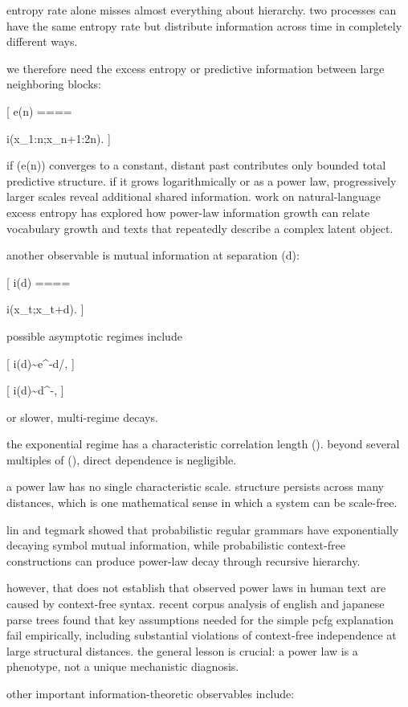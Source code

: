 entropy rate alone misses almost everything about hierarchy. two processes can have the same entropy rate but distribute information across time in completely different ways.

we therefore need the excess entropy or predictive information between large neighboring blocks:

[
e(n)
====

i(x_{1:n};x_{n+1:2n}).
]

if (e(n)) converges to a constant, distant past contributes only bounded total predictive structure. if it grows logarithmically or as a power law, progressively larger scales reveal additional shared information. work on natural-language excess entropy has explored how power-law information growth can relate vocabulary growth and texts that repeatedly describe a complex latent object.

another observable is mutual information at separation (d):

[
i(d)
====

i(x_t;x_{t+d}).
]

possible asymptotic regimes include

[
i(d)\sim e^{-d/\xi},
]

[
i(d)\sim d^{-\eta},
]

or slower, multi-regime decays.

the exponential regime has a characteristic correlation length (\xi). beyond several multiples of (\xi), direct dependence is negligible.

a power law has no single characteristic scale. structure persists across many distances, which is one mathematical sense in which a system can be scale-free.

lin and tegmark showed that probabilistic regular grammars have exponentially decaying symbol mutual information, while probabilistic context-free constructions can produce power-law decay through recursive hierarchy.

however, that does not establish that observed power laws in human text are caused by context-free syntax. recent corpus analysis of english and japanese parse trees found that key assumptions needed for the simple pcfg explanation fail empirically, including substantial violations of context-free independence at large structural distances. the general lesson is crucial: a power law is a phenotype, not a unique mechanistic diagnosis.

other important information-theoretic observables include:

